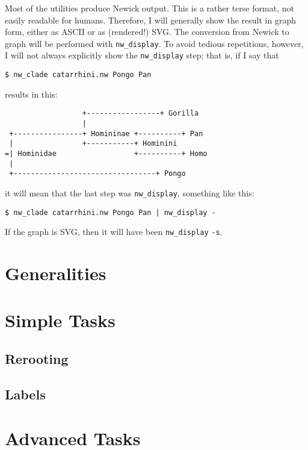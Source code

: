 \documentclass[a4paper,10pt]{report}
\newcommand{\ascii}{\textsc{ASCII}}
\newcommand{\svg}{\textsc{SVG}}
\newcommand{\display}{\texttt{nw\_display}}
\begin{document}
Most of the utilities produce Newick output. This is a rather terse format, not easily readable for humans. Therefore, I will generally show the result in graph form, either as \ascii{} or as (rendered!) \svg. The conversion from Newick to graph will be performed with \display{}. To avoid tedious repetitions, however, I will not always explicitly show the \display{} step; that is, if I say that 
\begin{verbatim}
$ nw_clade catarrhini.nw Pongo Pan
\end{verbatim} 
results in this:
\begin{samepage}
\begin{verbatim}
                  +-----------------+ Gorilla     
                  |                               
 +----------------+ Homininae +----------+ Pan    
 |                +-----------+ Hominini          
=| Hominidae                  +----------+ Homo   
 |                                                
 +---------------------------------+ Pongo  
\end{verbatim} 
\end{samepage}
it will mean that the last step was \display{}, something like this:
\begin{verbatim}
$ nw_clade catarrhini.nw Pongo Pan | nw_display -
\end{verbatim}
If the graph is \svg, then it will have been \display{} \verb+-s+.
\chapter{Generalities}

\label{chap_general}
 
\chapter{Simple Tasks}
\label{chap_simple}

\section{Rerooting}

\section{Labels}

\chapter{Advanced Tasks}
\label{chap_adv}
\end{document}

